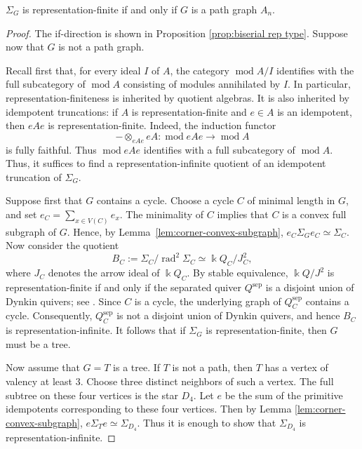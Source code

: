 \documentclass[a4paper,leqno]{amsart}
\begin{document}


\begin{thm}\label{thm:rep-finite}
$\Sigma_G$ is representation-finite if and only if $G$ is a path graph $A_n$.
\end{thm}

\begin{proof}
The if-direction is shown in Proposition \ref{prop:biserial rep type}.
Suppose now that $G$ is not a path graph.

Recall first that, for every ideal $I$ of $A$, the category $\operatorname{mod} A/I$ identifies with the full subcategory of $\operatorname{mod} A$ consisting of modules annihilated by $I$. In particular, representation-finiteness is inherited by quotient algebras. It is also inherited by idempotent truncations: if $A$ is
representation-finite and $e\in A$ is an idempotent, then $eAe$ is
representation-finite. Indeed, the induction functor
$$-\otimes_{eAe}eA:\operatorname{mod}eAe\longrightarrow
\operatorname{mod}A$$
is fully faithful. Thus $\operatorname{mod}eAe$ identifies with a full subcategory of $\operatorname{mod}A$. Thus, it suffices to find a representation-infinite quotient of an idempotent truncation of $\Sigma_G$.

Suppose first that $G$ contains a cycle. Choose a cycle $C$ of minimal
length in $G$, and set $e_C=\sum_{x\in V(C)}e_x$. The minimality of $C$ implies that $C$ is a convex full subgraph of $G$. Hence, by
Lemma~\ref{lem:corner-convex-subgraph}, $e_C\Sigma_Ge_C\simeq \Sigma_C$. Now consider the quotient
$$B_C:=\Sigma_C/\operatorname{rad}^2\Sigma_C\simeq \Bbbk Q_C/J_C^2,$$
where $J_C$ denotes the arrow ideal of $\Bbbk Q_C$.
By stable equivalence, $\Bbbk Q/J^2$ is representation-finite if and
only if the separated quiver $Q^{\operatorname{sep}}$ is a disjoint
union of Dynkin quivers; see \cite[Section~X.2]{ARS95}. Since $C$ is a
cycle, the underlying graph of $Q_C^{\operatorname{sep}}$ contains a
cycle. Consequently, $Q_C^{\operatorname{sep}}$ is not a disjoint union of Dynkin quivers, and hence $B_C$ is representation-infinite. It follows that if $\Sigma_G$ is representation-finite, then $G$ must be a tree.

Now assume that $G=T$ is a tree. If $T$ is not a path, then $T$ has a vertex of valency at least $3$. Choose three distinct neighbors of such a vertex. The full subtree on these four vertices is the star $D_4$. Let $e$ be the sum of the primitive idempotents corresponding to these four vertices. Then by Lemma \ref{lem:corner-convex-subgraph}, $e\Sigma_Te\simeq \Sigma_{D_4}$. Thus it is enough to show that $\Sigma_{D_4}$ is representation-infinite. 


\end{proof}
\end{document}

